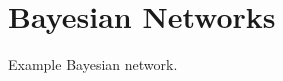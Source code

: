 \section{Bayesian Networks}

\begin{marginfigure}
\bayesianStudentExample
\caption{Example Bayesian network.}
\end{marginfigure}

